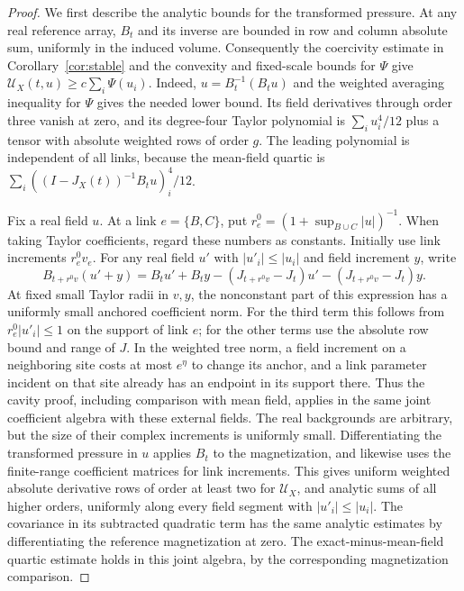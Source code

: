 \documentclass[11pt]{article}
\begin{document}
\begin{proof}
We first describe the analytic bounds for the transformed pressure.
At any real reference array, \(B_t\) and its inverse are bounded
in row and column absolute sum, uniformly in the induced volume.
Consequently the coercivity estimate in Corollary~\ref{cor:stable}
and the convexity and fixed-scale bounds for \(\Psi\) give
\(\mathcal U_X(t,u)\ge c\sum_i\Psi(u_i)\). Indeed,
\(u=B_t^{-1}(B_tu)\) and the weighted averaging inequality for
\(\Psi\) gives the needed lower bound. Its field derivatives
through order three vanish at zero, and its degree-four Taylor
polynomial is \(\sum_i u_i^4/12\) plus a tensor with absolute
weighted rows of order \(g\). The leading polynomial is independent
of all links, because the mean-field quartic is
\(\sum_i((I-J_X(t))^{-1}B_tu)_i^4/12\).

Fix a real field \(u\). At a link \(e=\{B,C\}\), put
\(r_e^0=(1+\sup_{B\cup C}|u|)^{-1}\). When taking Taylor
coefficients, regard these numbers as constants. Initially use
link increments \(r_e^0 v_e\). For any real field \(u'\) with
\(|u'_i|\le|u_i|\) and field increment \(y\), write
\[
 B_{t+r^0v}(u'+y)=B_tu'+B_ty-(J_{t+r^0v}-J_t)u'
                                      -(J_{t+r^0v}-J_t)y .
\]
At fixed small Taylor radii in \(v,y\), the nonconstant part
of this expression has a uniformly small anchored coefficient
norm. For the third term this follows from
\(r_e^0|u'_i|\le1\) on the support of link \(e\); for the other
terms use the absolute row bound and range of \(J\).
In the weighted tree norm, a field increment on a neighboring
site costs at most \(e^\eta\) to change its anchor, and a link
parameter incident on that site already has an endpoint in its
support there. Thus the cavity proof, including comparison with
mean field, applies in the same joint coefficient algebra with
these external fields. The real backgrounds are arbitrary, but
the size of their complex increments is uniformly small.
Differentiating the transformed pressure in \(u\) applies \(B_t\)
to the magnetization, and likewise uses the finite-range
coefficient matrices for link increments. This gives uniform
weighted absolute derivative rows of order at least two for
\(\mathcal U_X\), and analytic sums of all higher orders, uniformly
along every field segment with \(|u'_i|\le|u_i|\).
The covariance in its subtracted quadratic term has the same
analytic estimates by differentiating the reference magnetization
at zero. The exact-minus-mean-field quartic estimate holds in
this joint algebra, by the corresponding magnetization comparison.


\end{proof}
\end{document}
